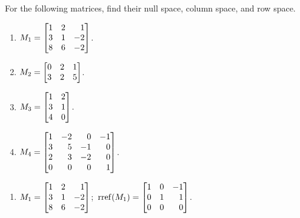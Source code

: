 \begin{exercises}
	\begin{problist}
		\prob For the following matrices, find their null space, column space,
		and row space.
		\begin{enumerate}
			\item $M_{1}=\mat{1&2&1\\3&1&-2\\8&6&-2}$.

			\item $M_{2}=\mat{0&2&1\\3&2&5}$.

			\item $M_{3}=\mat{1&2\\3&1\\4&0}$.

			\item $M_{4}=\mat{1&-2&0&-1\\3&5&-1&0\\2&3&-2&0\\0&0&0&1}$.
		\end{enumerate}


		\begin{solution}
			\begin{enumerate}
				\item $M_{1}= \mat{1&2&1\\3&1&-2\\8&6&-2}$;\, $\rref(M_{1})=\mat{1&0&-1\\0&1&1\\0&0&0}$.


\end{enumerate}
\end{solution}
\end{problist}
\end{exercises}
